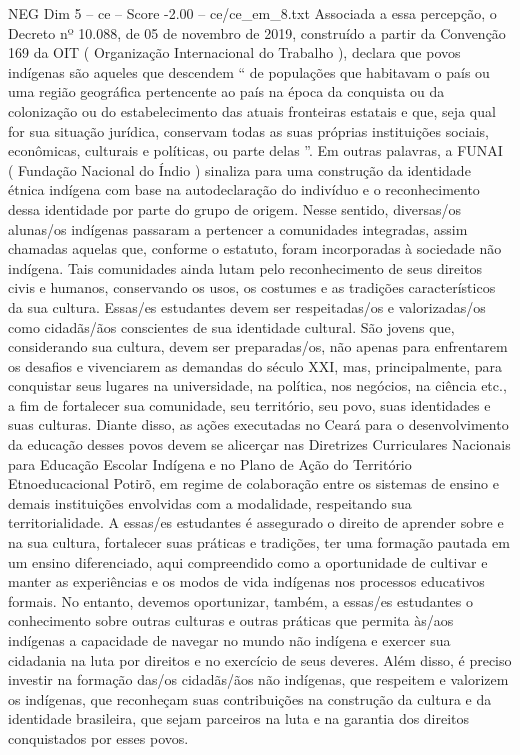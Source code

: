 \begin{textsample}{NEG Dim 5 – ce – Score -2.00 – ce/ce\_em\_8.txt}
Associada a essa percepção, o Decreto nº 10.088, de 05 de novembro de 2019, construído a partir da Convenção 169 da OIT ( Organização Internacional do Trabalho ), declara que povos indígenas são aqueles que descendem “ de populações que habitavam o país ou uma região geográfica pertencente ao país na época da conquista ou da colonização ou do estabelecimento das atuais fronteiras estatais e que, seja qual for sua situação jurídica, conservam todas as suas próprias instituições sociais, econômicas, culturais e políticas, ou parte delas ”.
Em outras palavras, a FUNAI ( Fundação Nacional do Índio ) sinaliza para uma construção da identidade étnica indígena com base na autodeclaração do indivíduo e o reconhecimento dessa identidade por parte do grupo de origem.
Nesse sentido, diversas/os alunas/os indígenas passaram a pertencer a comunidades integradas, assim chamadas aquelas que, conforme o estatuto, foram incorporadas à sociedade não indígena.
Tais comunidades ainda lutam pelo reconhecimento de seus direitos civis e humanos, conservando os usos, os costumes e as tradições característicos da sua cultura.
Essas/es estudantes devem ser respeitadas/os e valorizadas/os como cidadãs/ãos conscientes de sua identidade cultural.
São jovens que, considerando sua cultura, devem ser preparadas/os, não apenas para enfrentarem os desafios e vivenciarem as demandas do século XXI, mas, principalmente, para conquistar seus lugares na universidade, na política, nos negócios, na ciência etc., a fim de fortalecer sua comunidade, seu território, seu povo, suas identidades e suas culturas.
Diante disso, as ações executadas no Ceará para o desenvolvimento da educação desses povos devem se alicerçar nas Diretrizes Curriculares Nacionais para Educação Escolar Indígena e no Plano de Ação do Território Etnoeducacional Potirõ, em regime de colaboração entre os sistemas de ensino e demais instituições envolvidas com a modalidade, respeitando sua territorialidade.
A essas/es estudantes é assegurado o direito de aprender sobre e na sua cultura, fortalecer suas práticas e tradições, ter uma formação pautada em um ensino diferenciado, aqui compreendido como a oportunidade de cultivar e manter as experiências e os modos de vida indígenas nos processos educativos formais.
No entanto, devemos oportunizar, também, a essas/es estudantes o conhecimento sobre outras culturas e outras práticas que permita às/aos indígenas a capacidade de navegar no mundo não indígena e exercer sua cidadania na luta por direitos e no exercício de seus deveres.
Além disso, é preciso investir na formação das/os cidadãs/ãos não indígenas, que respeitem e valorizem os indígenas, que reconheçam suas contribuições na construção da cultura e da identidade brasileira, que sejam parceiros na luta e na garantia dos direitos conquistados por esses povos.

\end{textsample}
